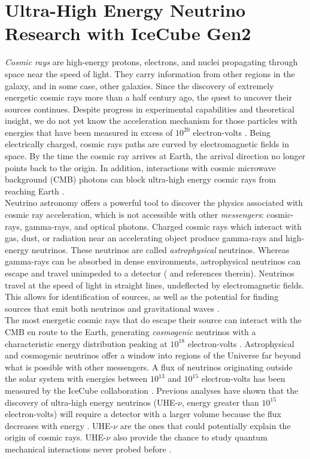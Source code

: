 \documentclass[../../../main.tex]{subfiles}
\begin{document}
\section{Ultra-High Energy Neutrino Research with IceCube Gen2}
\label{sec:neutrino}

\textit{Cosmic rays} are high-energy protons, electrons, and nuclei propagating through space near the speed of light.  They carry information from other regions in the galaxy, and in some case, other galaxies.  Since the discovery of extremely energetic cosmic rays more than a half century ago, the quest to uncover their sources continues.  Despite progress in experimental capabilities and theoretical insight, we do not yet know the acceleration mechanism for those particles with energies that have been measured in excess of $10^{20}$ electron-volts \cite{10.1088/1742-6596/1766/1/012002}.  Being electrically charged, cosmic rays paths are curved by electromagnetic fields in space.  By the time the cosmic ray arrives at Earth, the arrival direction no longer points back to the origin.  In addition, interactions with cosmic microwave background (CMB) photons can block ultra-high energy cosmic rays from reaching Earth \cite{PhysRevLett.16.748} \cite{1966JETPL...4...78Z}.
\\
\vspace{0.25cm}
Neutrino astronomy offers a powerful tool to discover the physics associated with cosmic ray acceleration, which is not accessible with other \textit{messengers}: cosmic-rays, gamma-rays, and  optical photons. Charged cosmic rays which interact with gas, dust, or radiation near an accelerating object produce gamma-rays and high-energy neutrinos.  These neutrinos are called \textit{astrophysical} neutrinos. Whereas gamma-rays can be absorbed in dense environments, astrophysical neutrinos can escape and travel unimpeded to a detector (\cite{Astro2020_1} and references therein). Neutrinos travel at the speed of light in straight lines, undeflected by electromagnetic fields.  This allows for identification of sources, as well as the potential for finding sources that emit both neutrinos and gravitational waves \cite{10.3847/2041-8213/ab9d24}.
\\
\vspace{0.25cm}
The most energetic cosmic rays that do escape their source can interact with the CMB en route to the Earth, generating \textit{cosmogenic} neutrinos with a characteristic energy distribution peaking at $10^{18}$ electron-volts \cite{10.1007/bf00645585} \cite{BERESINSKY1969423}.  Astrophysical and cosmogenic neutrinos offer a window into regions of the Universe far beyond what is possible with other messengers.  A flux of neutrinos originating outside the solar system with energies between $10^{13}$ and $10^{15}$ electron-volts has been measured by the IceCube collaboration \cite{PhysRevLett.111.021103}. Previous analyses have shown that the discovery of ultra-high energy neutrinos (UHE-$\nu$, energy greater than $10^{15}$ electron-volts) will require a detector with a larger volume because the flux decreases with energy \cite{PhysRevD.98.062003}. UHE-$\nu$ are the ones that could potentially explain the origin of cosmic rays.  UHE-$\nu$ also provide the chance to study quantum mechanical interactions never probed before \cite{Astro2020_1} \cite{Astro2020_2}.
\end{document}
